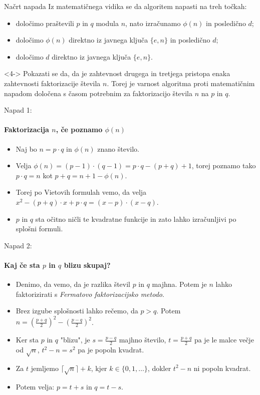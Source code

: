\documentclass[a4paper, 12pt]{beamer} %
\begin{document}
\begin{frame}{Načrt napada}
Iz matematičnega vidika se da algoritem napasti na treh točkah:
\begin{itemize}[label=]
\item<1-> določimo praštevili $p$ in $q$ modula $n$, nato izračunamo $\phi(n)$ in posledično $d$;
\item<2-> določimo $\phi(n)$ direktno iz javnega ključa $\{ e, n \}$ in posledično $d$;
\item<3-> določimo $d$ direktno iz javnega ključa $\{ e, n \}$.
\end{itemize}
\begin{block}<4->{}
Pokazati se da, da je zahtevnost drugega in tretjega pristopa enaka zahtevnosti faktorizacije števila $n$. Torej je varnost algoritma proti matematičnim napadom določena s časom potrebnim za faktorizacijo števila $n$ na $p$ in $q$.
\end{block}
\end{frame}

\begin{frame}{Napad 1:}
\framesubtitle{Faktorizacija $n$, če poznamo $\phi(n)$}
\begin{itemize}[label=]
\item<1-> Naj bo $n = p \cdot q$ in $\phi(n)$ znano število.
\item<2-> Velja $\phi(n) = (p-1) \cdot (q-1) = p \cdot q - (p + q) + 1$, torej poznamo tako $p \cdot q = n$ kot $p + q = n + 1 - \phi(n)$.
\item<3-> Torej po Vietovih formulah vemo, da velja $x^2 - (p+q) \cdot x + p \cdot q = (x-p) \cdot (x-q).$
\item<4-> $p$ in $q$ sta očitno ničli te kvadratne funkcije in zato lahko izračunljivi po splošni formuli.
\end{itemize}
\end{frame}

\begin{frame}{Napad 2:}
\framesubtitle{Kaj če sta $p$ in $q$ blizu skupaj?}
\begin{itemize}[label=]
\item<1-> Denimo, da vemo, da je razlika števil $p$ in $q$ majhna. Potem je $n$ lahko faktorizirati s \emph{Fermatovo faktorizacijsko metodo}.
\item<2-> Brez izgube splošnosti lahko rečemo, da $p > q$. Potem $n = (\frac{p+q}{2})^2 - (\frac{p-q}{2})^2$.
\item<3-> Ker sta $p$ in $q$ "blizu", je $s=\frac{p-q}{2}$ majhno število, $t = \frac{p+q}{2}$ pa je le malce večje od $\sqrt{n}$, $t^2 - n = s^2$ pa je popoln kvadrat.
\item<4-> Za $t$ jemljemo $\lceil \sqrt{n} \rceil + k$, kjer $k \in \{ 0, 1, \dots \}$, dokler $t^2 - n$ ni popoln kvadrat.
\item<5-> Potem velja: $p = t + s$ in $q = t - s$.
\end{itemize}
\end{frame}
\end{document}
